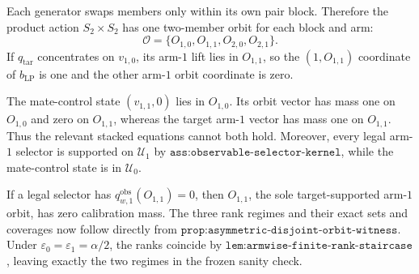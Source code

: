 Each generator swaps members only within its own pair block. Therefore the product action \(S_2\times S_2\) has one two-member orbit for each block and arm:
\[
\mathcal O=\{O_{1,0},O_{1,1},O_{2,0},O_{2,1}\}.
\tag{1}
\]
If \(q_{\mathrm{tar}}\) concentrates on \(v_{1,0}\), its arm-\(1\) lift lies in \(O_{1,1}\), so the \((1,O_{1,1})\) coordinate of \(b_{\mathrm{LP}}\) is one and the other arm-\(1\) orbit coordinate is zero.

The mate-control state \((v_{1,1},0)\) lies in \(O_{1,0}\). Its orbit vector has mass one on \(O_{1,0}\) and zero on \(O_{1,1}\), whereas the target arm-\(1\) vector has mass one on \(O_{1,1}\). Thus the relevant stacked equations cannot both hold. Moreover, every legal arm-\(1\) selector is supported on \(\mathcal U_1\) by \(\texttt{ass:observable-selector-kernel}\), while the mate-control state is in \(\mathcal U_0\).

If a legal selector has \(q^{\mathrm{obs}}_{w,1}(O_{1,1})=0\), then \(O_{1,1}\), the sole target-supported arm-\(1\) orbit, has zero calibration mass. The three rank regimes and their exact sets and coverages now follow directly from \(\texttt{prop:asymmetric-disjoint-orbit-witness}\). Under \(\varepsilon_0=\varepsilon_1=\alpha/2\), the ranks coincide by \(\texttt{lem:armwise-finite-rank-staircase}\), leaving exactly the two regimes in the frozen sanity check.